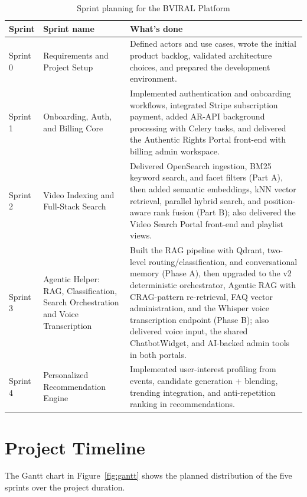 \begin{table}[H]
\centering
\caption{Sprint planning for the BVIRAL Platform}
\label{tab:sprint_plan}
\begin{tabularx}{\textwidth}{l>{\raggedright\arraybackslash}p{}X}
\toprule
\textbf{Sprint} & \textbf{Sprint name} & \textbf{What's done} \\
\midrule
Sprint 0 & Requirements and Project Setup & Defined actors and use cases, wrote the initial product backlog, validated architecture choices, and prepared the development environment. \\
Sprint 1 & Onboarding, Auth, and Billing Core & Implemented authentication and onboarding workflows, integrated Stripe subscription payment, added AR-API background processing with Celery tasks, and delivered the Authentic Rights Portal front-end with billing admin workspace. \\
Sprint 2 & Video Indexing and Full-Stack Search & Delivered OpenSearch ingestion, BM25 keyword search, and facet filters (Part A), then added semantic embeddings, kNN vector retrieval, parallel hybrid search, and position-aware rank fusion (Part B); also delivered the Video Search Portal front-end and playlist views. \\
Sprint 3 & Agentic Helper: RAG, Classification, Search Orchestration and Voice Transcription & Built the RAG pipeline with Qdrant, two-level routing/classification, and conversational memory (Phase A), then upgraded to the v2 deterministic orchestrator, Agentic RAG with CRAG-pattern re-retrieval, FAQ vector administration, and the Whisper voice transcription endpoint (Phase B); also delivered voice input, the shared ChatbotWidget, and AI-backed admin tools in both portals. \\
Sprint 4 & Personalized Recommendation Engine & Implemented user-interest profiling from events, candidate generation + blending, trending integration, and anti-repetition ranking in recommendations. \\
\bottomrule
\end{tabularx}
\end{table}

\section{Project Timeline}

The Gantt chart in Figure~\ref{fig:gantt} shows the planned distribution of the five sprints over
the project duration.

